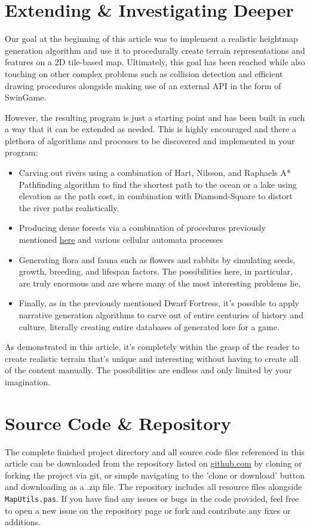 \documentclass{article}
\begin{document}
\section{Extending \& Investigating Deeper}
Our goal at the beginning of this article was to implement a realistic heightmap generation algorithm and use it to procedurally create terrain representations and features on a 2D tile-based map. Ultimately, this goal has been reached while also touching on other complex problems such as collision detection and efficient drawing procedures alongside making use of an external API in the form of SwinGame.
\par
However, the resulting program is just a starting point and has been built in such a way that it can be extended as needed. This is highly encouraged and there a plethora of algorithms and processes to be discovered and implemented in your program:
\begin{itemize}
\item
Carving out rivers using a combination of Hart, Nilsson, and Raphaels A* Pathfinding algorithm \parencite{astar} to find the shortest path to the ocean or a lake using elevation as the path cost, in combination with Diamond-Square to distort the river paths realistically.
\item
Producing dense forests via a combination of procedures previously mentioned \hyperref[forestalgo]{here} and various cellular automata processes
\item
Generating flora and fauna such as flowers and rabbits by simulating seeds, growth, breeding, and lifespan factors. The possibilities here, in particular, are truly enormous and are where many of the most interesting problems lie.
\item
Finally, as in the previously mentioned Dwarf Fortress, it's possible to apply narrative generation algorithms to carve out of entire centuries of history and culture, literally creating entire databases of generated lore for a game.
\end{itemize}

As demonstrated in this article, it's completely within the grasp of the reader to create realistic terrain that's unique and interesting without having to create all of the content manually. The possibilities are endless and only limited by your imagination.

\printbibliography

\appendix
\setcounter{secnumdepth}{0}
\section{Source Code \& Repository}
The complete finished project directory and all source code files referenced in this article can be downloaded from the repository listed on \href{https://github.com/jacobmilligan/intro_hd_report}{github.com} by cloning or forking the project via git, or simple navigating to the 'clone or download' button and downloading as a .zip file. The repository includes all resource files alongside \texttt{MapUtils.pas}. If you have find any issues or bugs in the code provided, feel free to open a new issue on the repository page or fork and contribute any fixes or additions.
\end{document}

